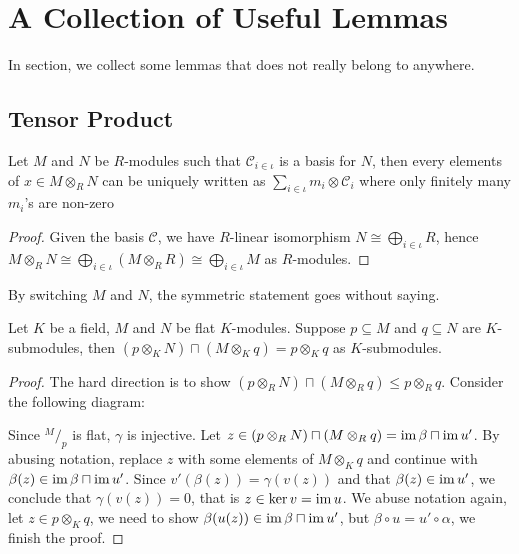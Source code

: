 \section{A Collection of Useful Lemmas}\label{sec:unclassified}

In section, we collect some lemmas that does not really belong to anywhere.

\subsection{Tensor Product}

\begin{lemma}\label{lem:expand-tensor-in-basis}
  Let $M$ and $N$ be $R$-modules such that $\mathcal{C}_{i\in\iota}$ is a basis
  for $N$, then every elements of $x \in M \otimes_{R} N$ can be uniquely
  written as $\sum_{i\in\iota}m_{i}\otimes \mathcal{C}_{i}$ where only finitely
  many $m_{i}$'s are non-zero
\end{lemma}

\begin{proof}
  Given the basis $\mathcal{C}$, we have $R$-linear isomorphism
  $N \cong\bigoplus_{i\in\iota}R$, hence
  $M\otimes_{R}N \cong \bigoplus_{i\in\iota}(M\otimes_{R}R)\cong\bigoplus_{i\in\iota}M$
  as $R$-modules.
\end{proof}
By switching $M$ and $N$, the symmetric statement goes without saying.


\begin{lemma}
  \label{lem:submodule-tensor-submodule}
  Let $K$ be a field, $M$ and $N$ be flat $K$-modules. Suppose $p \subseteq M$
  and $q \subseteq N$ are $K$-submodules, then
  $(p \otimes_{K} N) \sqcap (M \otimes_{K} q) = p \otimes_{K} q$ as
  $K$-submodules.
\end{lemma}

\begin{proof}
  The hard direction is to show
  $(p \otimes_{R} N) \sqcap (M \otimes_{R} q) \le p \otimes_{R} q$. Consider the
  following diagram:
  \begin{center}
  \end{center}
  Since $^{M}/_{p}$ is flat, $\gamma$ is injective. Let
  $z \in (p \otimes_{R} N) \sqcap (M \otimes_{R} q) = \operatorname{im} \beta \sqcap \operatorname{im} u'$.
  By abusing notation, replace $z$ with some elements of $M \otimes_{K} q$ and
  continue with $\beta(z)\in\operatorname{im} \beta \sqcap \operatorname{im} u'$. Since
  $v'(\beta(z))=\gamma(v(z))$ and that $\beta(z)\in \operatorname{im} u'$, we conclude that
  $\gamma(v(z))=0$, that is $z\in\ker v=\operatorname{im} u$. We abuse notation again, let
  $z \in p \otimes_{K} q$, we need to show
  $\beta(u(z))\in\operatorname{im} \beta \sqcap \operatorname{im} u'$, but $\beta\circ u=u'\circ\alpha$, we
  finish the proof.
\end{proof}

